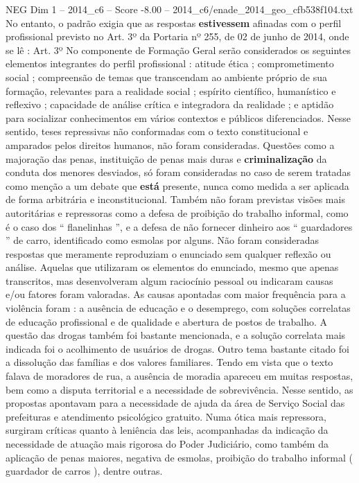 \begin{textsample}{NEG Dim 1 – 2014\_c6 – Score -8.00 – 2014\_c6/enade\_2014\_geo\_cfb538f104.txt}
No entanto, o padrão exigia que as respostas \textbf{estivessem} afinadas com o perfil profissional previsto no Art. 3º da Portaria nº 255, de 02 de junho de 2014, onde se lê : Art. 3º No componente de Formação Geral serão considerados os seguintes elementos integrantes do perfil profissional : atitude ética ; comprometimento social ; compreensão de temas que transcendam ao ambiente próprio de sua formação, relevantes para a realidade social ; espírito científico, humanístico e reflexivo ; capacidade de análise crítica e integradora da realidade ; e aptidão para socializar conhecimentos em vários contextos e públicos diferenciados.
Nesse sentido, teses repressivas não conformadas com o texto constitucional e amparados pelos direitos humanos, não foram consideradas.
Questões como a majoração das penas, instituição de penas mais duras e \textbf{criminalização} da conduta dos menores desviados, só foram consideradas no caso de serem tratadas como menção a um debate que \textbf{está} presente, nunca como medida a ser aplicada de forma arbitrária e inconstitucional.
Também não foram previstas visões mais autoritárias e repressoras como a defesa de proibição do trabalho informal, como é o caso dos “ flanelinhas ”, e a defesa de não fornecer dinheiro aos “ guardadores ” de carro, identificado como esmolas por alguns.
Não foram consideradas respostas que meramente reproduziam o enunciado sem qualquer reflexão ou análise.
Aquelas que utilizaram os elementos do enunciado, mesmo que apenas transcritos, mas desenvolveram algum raciocínio pessoal ou indicaram causas e/ou fatores foram valoradas.
As causas apontadas com maior frequência para a violência foram : a ausência de educação e o desemprego, com soluções correlatas de educação profissional e de qualidade e abertura de postos de trabalho.
A questão das drogas também foi bastante mencionada, e a solução correlata mais indicada foi o acolhimento de usuários de drogas.
Outro tema bastante citado foi a dissolução das famílias e dos valores familiares.
Tendo em vista que o texto falava de moradores de rua, a ausência de moradia apareceu em muitas respostas, bem como a disputa territorial e a necessidade de sobrevivência.
Nesse sentido, as propostas apontavam para a necessidade de ajuda da área de Serviço Social das prefeituras e atendimento psicológico gratuito.
Numa ótica mais repressora, surgiram críticas quanto à leniência das leis, acompanhadas da indicação da necessidade de atuação mais rigorosa do Poder Judiciário, como também da aplicação de penas maiores, negativa de esmolas, proibição do trabalho informal ( guardador de carros ), dentre outras.

\end{textsample}
